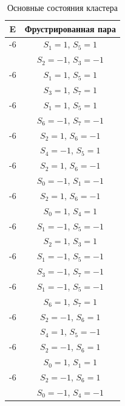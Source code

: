 \documentclass[utf8, babel, sor, jor, amsmath,amssymb, reprint]{elsarticle} %
\begin{document}
\begin{table}[h]
	\centering
	\begin{tabular}{|c|c|}
		\hline
		E   &   Фрустрированная пара \\
		\hline
		-6   &  $S_1=1$, $S_5=1$\\
		      &    $S_2=-1$, $S_3=-1$ \\
		 \hline
		 -6   &  $S_1=1$, $S_5=1$\\
		      &    $S_3=1$, $S_7=1$ \\
		 \hline
		 -6   &  $S_1=1$, $S_5=1$\\
		      &    $S_6=-1$, $S_7=-1$ \\
		 \hline
		-6   &  $S_2=1$, $S_6=-1$\\
				&    $S_4=-1$, $S_5=1$ \\
		 \hline
		-6   &  $S_2=1$, $S_6=-1$\\
				&    $S_0=-1$, $S_1=-1$ \\
		 \hline
		-6   &  $S_2=1$, $S_6=-1$\\
				&    $S_0=1$, $S_4=1$ \\
		\hline
		-6   &  $S_1=-1$, $S_5=-1$\\
			&    $S_2=1$, $S_3=1$ \\
		\hline
		-6   &  $S_1=-1$, $S_5=-1$\\
			&    $S_3=-1$, $S_7=-1$ \\
		\hline
		-6   &  $S_1=-1$, $S_5=-1$\\
			&    $S_6=1$, $S_7=1$ \\
		\hline
		-6   &  $S_2=-1$, $S_6=1$\\
			&    $S_4=1$, $S_5=-1$ \\
		\hline
		-6   &  $S_2=-1$, $S_6=1$\\
			&    $S_0=1$, $S_1=1$ \\
		\hline
		-6   &  $S_2=-1$, $S_6=1$\\
			&    $S_0=-1$, $S_4=-1$ \\
		\hline
	\end{tabular}
	\caption{Основные состояния кластера}
	\label{tab:gs_cl}
\end{table}
\end{document}
